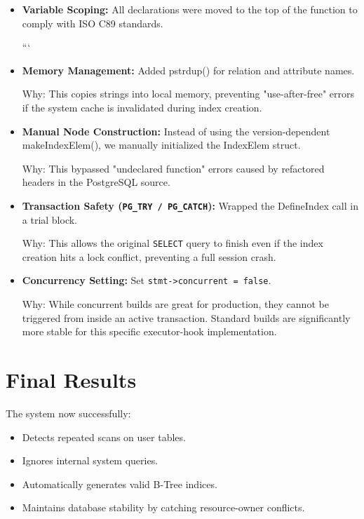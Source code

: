 \documentclass[12pt]{article}
\begin{document}
\begin{itemize}[leftmargin=*]
\item \textbf{Variable Scoping:} All declarations were moved to the top of the function to comply with ISO C89 standards.

```
\item \textbf{Memory Management:} Added pstrdup() for relation and attribute names.

Why: This copies strings into local memory, preventing "use-after-free" errors if the system cache is invalidated during index creation.

\item \textbf{Manual Node Construction:} Instead of using the version-dependent makeIndexElem(), we manually initialized the IndexElem struct.

Why: This bypassed "undeclared function" errors caused by refactored headers in the PostgreSQL source.

\item \textbf{Transaction Safety (\texttt{PG\_TRY / PG\_CATCH}):} Wrapped the DefineIndex call in a trial block.

Why: This allows the original \texttt{SELECT} query to finish even if the index creation hits a lock conflict, preventing a full session crash.

\item \textbf{Concurrency Setting:} Set \texttt{stmt->concurrent = false}.

Why: While concurrent builds are great for production, they cannot be triggered from inside an active transaction. Standard builds are significantly more stable for this specific executor-hook implementation.

\end{itemize}

\section*{Final Results}

The system now successfully:
\begin{itemize}[leftmargin=*]
\item Detects repeated scans on user tables.
\item Ignores internal system queries.
\item Automatically generates valid B-Tree indices.
\item Maintains database stability by catching resource-owner conflicts.
\end{itemize}
\end{document}
